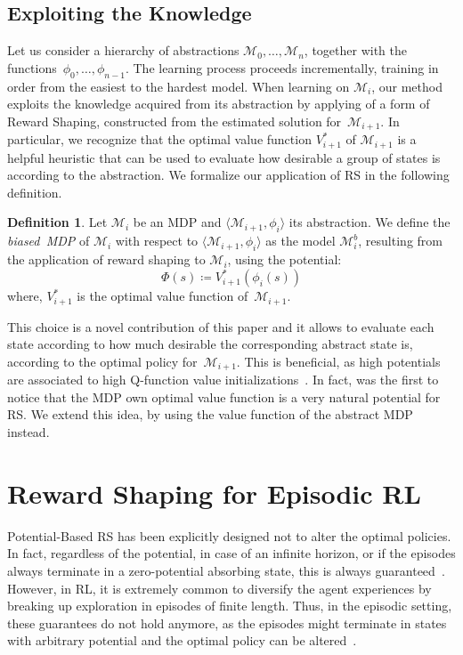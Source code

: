 \documentclass[letterpaper]{article} %
\theoremstyle{plain}
\theoremstyle{definition}
\newtheorem{definition}{Definition}
\theoremstyle{remark}
\newcommand{\SetSym}[1]{\mathcal{#1}}
\newcommand{\Model}{\SetSym{M}}
\newcommand{\Mapping}{\phi}
\newcommand{\Potential}{\Phi}
\newcommand{\Biased}[1]{#1^{b}}
\begin{document}
\subsection{Exploiting the Knowledge}
Let us consider a hierarchy of abstractions $\Model_0, \dots, \Model_n$, together with
the functions~$\Mapping_{0}, \dots, \Mapping_{n-1}$. The learning process proceeds
incrementally, training in order from the easiest to the hardest model.
When learning on $\Model_i$, our method exploits the knowledge acquired from its abstraction by applying of a form of Reward Shaping, constructed from the estimated solution for~$\Model_{i+1}$.
In particular, we recognize that the optimal value function $V^*_{i+1}$ of $\Model_{i+1}$ is a
helpful heuristic that can be used to evaluate how desirable a group of states is according to the abstraction.
We formalize our application of RS in the following definition.
\begin{definition}
Let $\Model_i$ be an MDP and $\langle \Model_{i+1}, \Mapping_i \rangle$ its abstraction.
We define the \emph{biased~MDP} of $\Model_i$ with respect to $\langle \Model_{i+1}, \Mapping_i \rangle$
as the model $\Biased\Model_i$, resulting
from the application of reward shaping to $\Model_i$, using the potential:
\begin{equation}
\Potential(s) \coloneqq V_{i+1}^*(\Mapping_i(s))
\label{eq:shaping-potential}
\end{equation}
where, $V_{i+1}^*$ is the optimal value function of~$\Model_{i+1}$.
\label{def:biased-mdp}
\end{definition}

This choice is a novel contribution of this paper and it allows to evaluate each state
according to how much desirable the corresponding abstract state is, according to the optimal policy for~$\Model_{i+1}$.
This is beneficial, as high potentials are associated to high Q-function value initializations~\cite{wiewiora2003potential}.
In fact, \cite{ng1999policy} was the first to notice that the MDP own optimal value function is a very natural potential for RS.
We extend this idea, by using the value function of the abstract MDP instead.


\section{Reward Shaping for Episodic RL}
\label{sec:shaping-episodes}

Potential-Based RS has been explicitly designed not to alter the optimal
policies. In fact, regardless of the potential, in case of an infinite horizon, or
if the episodes always terminate in a zero-potential absorbing state, this is always
guaranteed~\cite{ng1999policy}.  However, in RL, it is extremely common to diversify the agent experiences by
breaking up exploration in episodes of finite length. Thus, in the episodic
setting, these guarantees do not hold anymore, as the episodes might terminate
in states with arbitrary potential and the optimal policy can be altered~\cite{grzes2017reward}.
\end{document}
